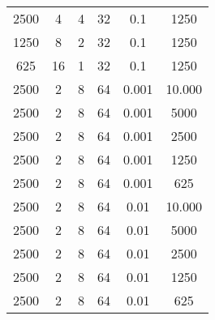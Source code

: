 \begin{tabularx}{\linewidth}{ |c|c|c|c|c|c|  }
    2500 & 4   & 4     & 32  & 0.1   & 1250                                                                                                                               \\
    1250 & 8   & 2     & 32  & 0.1   & 1250                                                                                                                               \\
    625  & 16  & 1     & 32  & 0.1   & 1250                                                                                                                               \\
    \hline
    2500 & 2   & 8     & 64  & 0.001 & 10.000                                                                                                                             \\
    2500 & 2   & 8     & 64  & 0.001 & 5000                                                                                                                               \\
    2500 & 2   & 8     & 64  & 0.001 & 2500                                                                                                                               \\
    2500 & 2   & 8     & 64  & 0.001 & 1250                                                                                                                               \\
    2500 & 2   & 8     & 64  & 0.001 & 625                                                                                                                                \\
    2500 & 2   & 8     & 64  & 0.01  & 10.000                                                                                                                             \\
    2500 & 2   & 8     & 64  & 0.01  & 5000                                                                                                                               \\
    2500 & 2   & 8     & 64  & 0.01  & 2500                                                                                                                               \\
    2500 & 2   & 8     & 64  & 0.01  & 1250                                                                                                                               \\
    2500 & 2   & 8     & 64  & 0.01  & 625                                                                                                                                \\

\end{tabularx}

